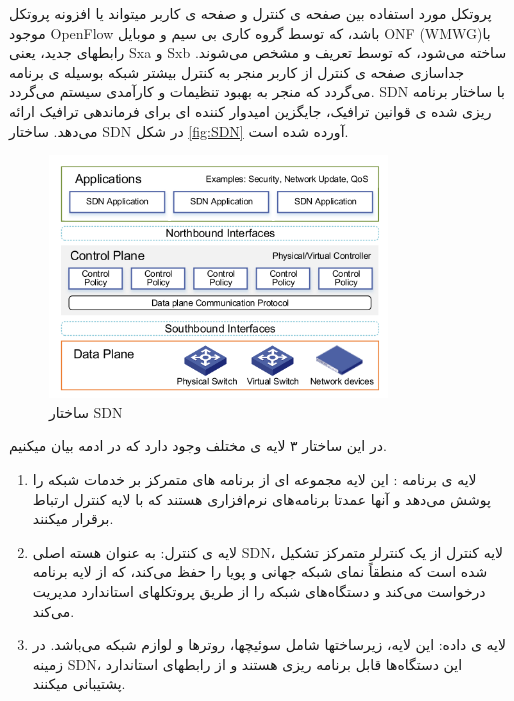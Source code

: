  پروتکل مورد استفاده بین صفحه ی کنترل و صفحه ی کاربر میتواند یا افزونه پروتکل موجود OpenFlow باشد، که توسط گروه کاری بی سیم و موبایل ONF (WMWG)با رابطهای جدید، یعنی Sxa و Sxb ساخته می‌شود، که توسط   تعریف و مشخص می‌شوند\cite{SDN2}. 
 جداسازی صفحه ی کنترل از کاربر منجر به کنترل بیشتر شبکه بوسیله ی برنامه می‌گردد که منجر به بهبود تنظیمات و کارآمدی سیستم می‌گردد.
 SDN
  با ساختار برنامه ریزی شده ی قوانین ترافیک، جایگزین امیدوار کننده ای برای فرماندهی ترافیک ارائه می‌دهد.
  ساختار SDN در شکل \eqref{fig:SDN} آورده شده است.
  \begin{figure}
  \centering
    \includegraphics[width=0.8\textwidth]{./fig/SDN}
  \caption{ ساختار SDN \cite{SDN3}}
  \label{fig:SDN}
\end{figure} 
  در این ساختار ۳ لایه ی مختلف وجود دارد که در ادمه بیان میکنیم\cite{SDN3}.
  \begin{enumerate}
  \item لایه ی برنامه :
  این لایه مجموعه ای از برنامه ‌های متمرکز بر خدمات شبکه را پوشش می‌دهد و آنها عمدتا برنامه‌‌های نرم‌افزاری هستند که با لایه کنترل ارتباط برقرار میکنند.
  \item لایه ی کنترل:
  به عنوان هسته اصلی SDN، لایه کنترل از یک کنترلر متمرکز تشکیل شده است که منطقاً نمای شبکه جهانی و پویا را حفظ می‌کند،  که از لایه برنامه درخواست می‌کند و دستگاه‌های شبکه را از طریق پروتکلهای استاندارد مدیریت می‌کند.
  \item لایه ی داده:
  این لایه، زیرساختها شامل سوئیچها، روترها و لوازم شبکه می‌باشد. در زمینه SDN، این دستگاه‌ها قابل برنامه ریزی هستند و از رابطهای استاندارد پشتیبانی میکنند.
  \end{enumerate}
